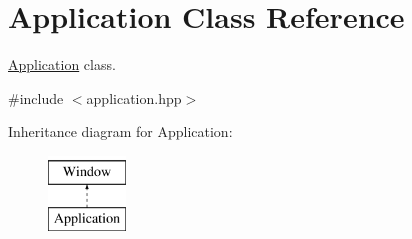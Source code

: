 \hypertarget{classApplication}{}\section{Application Class Reference}
\label{classApplication}


\hyperlink{classApplication}{Application} class.  




{\ttfamily \#include $<$application.\+hpp$>$}

Inheritance diagram for Application\+:\begin{figure}[H]
\begin{center}
\leavevmode
\includegraphics[height=2.000000cm]{classApplication}
\end{center}
\end{figure}
